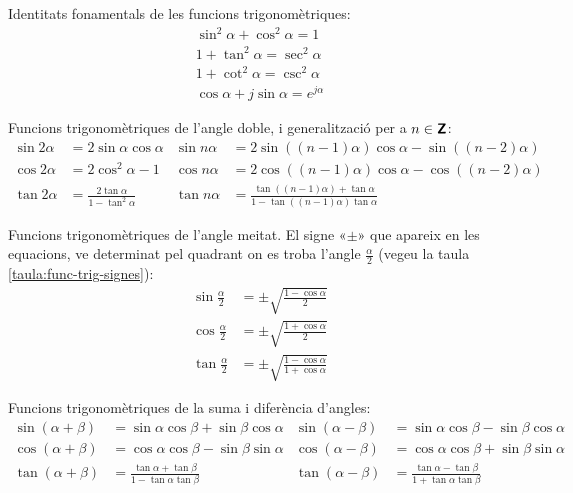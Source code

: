 Identitats fonamentals de les funcions trigonomètriques:
\begin{gather}
    \sin^2\alpha + \cos^2\alpha = 1 \\
    1 + \tan^2\alpha = \sec^2\alpha\\
    1 + \cot^2\alpha = \csc^2\alpha\\
    \cos\alpha + j \sin\alpha = e^{j\alpha}
\end{gather}

Funcions trigonomètriques de l'angle doble, i generalització per a
$n\in{\ensuremath{\boldsymbol{\mathsf{Z}}}}$:
\begin{subequations}
\begin{align}
    \sin 2\alpha &= 2 \sin\alpha \cos\alpha & \sin n \alpha &=
    2\sin((n-1)\alpha)\cos \alpha -\sin((n-2)\alpha)\\[1ex]
    \cos 2\alpha &= 2\cos^2\alpha -1 & \cos n\alpha &=
    2\cos((n-1)\alpha)\cos \alpha -\cos((n-2)\alpha)\\[1ex]
    \tan 2\alpha &=\frac{2\tan\alpha}{1-\tan^2\alpha} & \tan n
    \alpha &= \frac{\tan((n-1)\alpha)+\tan\alpha}{1-\tan((n-1)\alpha)\tan\alpha}
\end{align}
\end{subequations}


Funcions trigonomètriques de l'angle meitat. El signe «$\pm$» que
apareix en les equacions, ve determinat pel quadrant on es troba
l'angle $\frac{\alpha}{2}$ (vegeu la taula
\vref{taula:func-trig-signes}):
\begin{subequations}
\begin{align}
    \sin \frac{\alpha}{2} &= \pm \sqrt{\frac{1-\cos\alpha}{2}}\\[1ex]
    \cos \frac{\alpha}{2} &= \pm \sqrt{\frac{1+\cos\alpha}{2}}\\[1ex]
    \tan \frac{\alpha}{2} &= \pm \sqrt{\frac{1-\cos\alpha}{1+\cos\alpha}}
\end{align}
\end{subequations}


Funcions trigonomètriques de la suma i diferència d'angles:
\begin{subequations}
\begin{align}
    \sin(\alpha+\beta) &= \sin\alpha \cos\beta + \sin\beta\cos\alpha &
    \sin(\alpha-\beta) &= \sin\alpha \cos\beta - \sin\beta\cos\alpha\\[1ex]
    \cos(\alpha+\beta) &= \cos\alpha \cos\beta - \sin\beta\sin\alpha &
    \cos(\alpha-\beta) &= \cos\alpha \cos\beta + \sin\beta\sin\alpha\label{eq:D13b}\\[1ex]
    \tan(\alpha+\beta) &=\frac{\tan\alpha+\tan\beta}{1-\tan\alpha\tan\beta} &
    \tan(\alpha-\beta)
    &=\frac{\tan\alpha-\tan\beta}{1+\tan\alpha\tan\beta}
\end{align}
\end{subequations}

